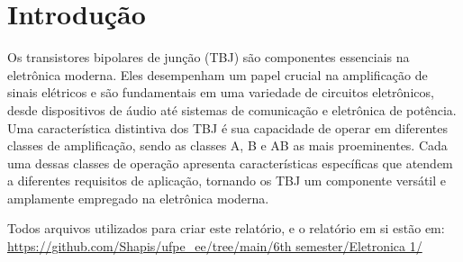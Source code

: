 \section{Introdução}

Os transistores bipolares de junção (TBJ) são componentes essenciais na eletrônica moderna. Eles desempenham um papel crucial na amplificação de sinais elétricos e são fundamentais em uma variedade de circuitos eletrônicos, desde dispositivos de áudio até sistemas de comunicação e eletrônica de potência. Uma característica distintiva dos TBJ é sua capacidade de operar em diferentes classes de amplificação, sendo as classes A, B e AB as mais proeminentes. Cada uma dessas classes de operação apresenta características específicas que atendem a diferentes requisitos de aplicação, tornando os TBJ um componente versátil e amplamente empregado na eletrônica moderna.

Todos arquivos utilizados para criar este relatório, e o relatório em si estão em:  \url{https://github.com/Shapis/ufpe_ee/tree/main/6th semester/Eletronica 1/}